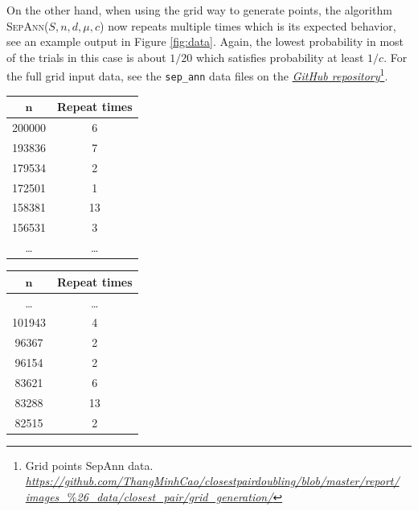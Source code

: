 \documentclass[12pt,english,]{article}
\newcommand{\code}[1]{\colorbox{light-gray}{\texttt{#1}}}
\let\origfigure\figure
\let\endorigfigure\endfigure
\renewenvironment{figure}[1][2] {
    \expandafter\origfigure\expandafter[H]
} {
    \endorigfigure
}
\begin{document}
On the other hand, when using the grid way to generate points, the
algorithm \textsc{SepAnn($S,n,d,\mu,c$)} now repeats multiple times
which is its expected behavior, see an example output in Figure
\ref{fig:data}. Again, the lowest probability in most of the trials in
this case is about \(1/20\) which satisfies probability at least
\(1/c\). For the full grid input data, see the \code{sep\_ann} data
files on the
\href{https://github.com/ThangMinhCao/closestpairdoubling/blob/master/report/images_\%26_data/closest_pair/grid_generation/}{\emph{GitHub
repository}}\footnote{Grid points SepAnn data.
  \href{https://github.com/ThangMinhCao/closestpairdoubling/blob/master/report/images_\%26_data/closest_pair/grid_generation/}{\emph{https://github.com/ThangMinhCao/closestpairdoubling/blob/master/report/}
  \emph{images}\_\%\emph{26\_data/closest\_pair/grid\_generation/}}}.

\begin{figure}
\begin{minipage}{0.48\textwidth}
  \centering
  \begin{tabular}{|c|c|}
  \hline
  $\boldsymbol n$   & \textbf{Repeat times} \\ \hline
   200000  & 6            \\ \hline
   193836  & 7            \\ \hline
   179534  & 2            \\ \hline
   172501  & 1            \\ \hline
   158381  & 13           \\ \hline
   156531  & 3            \\ \hline
  \ldots   & \ldots       \\ \hline
  \end{tabular}
\end{minipage}
\begin{minipage}{0.48\textwidth}
  \centering
  \begin{tabular}{|c|c|}
  \hline
  $\boldsymbol n$   & \textbf{Repeat times} \\ \hline
  \ldots   & \ldots       \\ \hline
  101943   & 4            \\ \hline
   96367   & 2            \\ \hline
   96154   & 2            \\ \hline
   83621   & 6            \\ \hline
   83288   & 13           \\ \hline
   82515   & 2            \\ \hline
  \end{tabular}
\end{minipage}
\caption[Caption]{Given an input of $200\,000$ points generated in a grid. This is a portion of the data about the number of times the algorithm \textsc{SepAnn$(S,n,d,\mu,c)$} repeats.}
\label{fig:data}
\end{figure}
\end{document}
